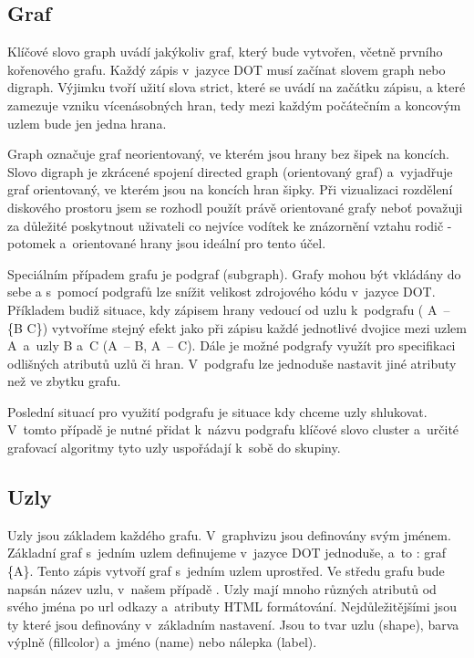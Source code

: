 \documentclass[color,table,oneside,nolot,nolof]{fithesis}
\begin{document}
\subsection{Graf}
	Klíčové slovo graph uvádí jakýkoliv graf, který bude vytvořen, včetně prvního kořenového grafu. Každý zápis v~jazyce DOT musí začínat slovem graph nebo digraph. Výjimku tvoří užití slova
	strict, které se uvádí na začátku zápisu, a které zamezuje vzniku vícenásobných hran, tedy mezi každým počátečním a koncovým uzlem bude jen jedna hrana. 

	Graph označuje graf neorientovaný, ve kterém jsou hrany bez šipek na koncích. Slovo digraph je zkrácené spojení directed graph (orientovaný
	graf) a~vyjadřuje graf orientovaný, ve kterém jsou na koncích hran šipky. Při vizualizaci rozdělení diskového prostoru jsem se rozhodl použít právě orientované grafy neboť považuji za 
	důležité poskytnout uživateli co nejvíce vodítek ke znázornění vztahu rodič - potomek a~orientované hrany jsou ideální pro tento účel. 

	Speciálním případem grafu je podgraf (subgraph). Grafy mohou být vkládány do sebe a s~pomocí podgrafů lze snížit velikost zdrojového kódu v~jazyce DOT. Příkladem budiž situace, kdy zápisem
	hrany vedoucí od uzlu k~podgrafu ( A~-- \{B C\}) vytvoříme stejný efekt jako při zápisu každé jednotlivé dvojice mezi uzlem A~a~uzly B a~C (A~-- B, A~-- C). Dále je možné podgrafy využít
	pro specifikaci odlišných atributů uzlů či hran. V~podgrafu lze jednoduše nastavit jiné atributy než ve zbytku grafu.

	Poslední situací pro využití podgrafu je situace kdy chceme uzly shlukovat. V~tomto případě je nutné přidat k~názvu podgrafu klíčové slovo cluster a~určité grafovací algoritmy tyto uzly 
	uspořádají k~sobě do skupiny.

\subsection{Uzly}
	Uzly jsou základem každého grafu. V~graphvizu jsou definovány svým jménem. Základní graf s~jedním uzlem definujeme v~jazyce DOT jednoduše, a~to : graf \{A\}. Tento zápis vytvoří
	graf s~jedním uzlem uprostřed. Ve středu grafu bude napsán název uzlu, v~našem případě . Uzly mají mnoho různých atributů od svého jména po url odkazy a~atributy HTML formátování. 
	Nejdůležitějšími jsou ty které jsou definovány v~základním nastavení. Jsou to tvar uzlu (shape), barva výplně (fillcolor) a~jméno (name) nebo nálepka (label). 
	
\end{document}
